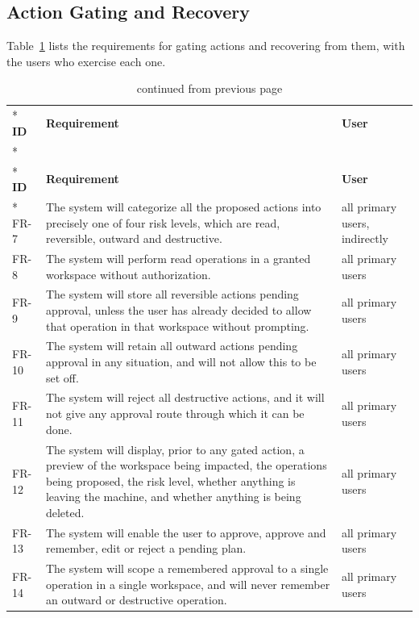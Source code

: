 \documentclass{FastFyp}
\begin{document}
\subsection{Action Gating and Recovery}
Table~\ref{tab:fr2} lists the requirements for gating actions and recovering from them, with the users who exercise each one.

{\small
{}
\begin{longtable}{|p{1.3cm}|p{9.8cm}|p{3.0cm}|}
\caption{Functional requirements: action gating and recovery.}\label{tab:fr2}\\*
\hline
\textbf{ID} & \textbf{Requirement} & \textbf{User} \\*
\hline
\endfirsthead
\caption[]{continued from previous page}\\*
\hline
\textbf{ID} & \textbf{Requirement} & \textbf{User} \\*
\hline
\endhead
FR-7 & The system will categorize all the proposed actions into precisely one of four risk levels, which are read, reversible, outward and destructive. & all primary users, indirectly \\
\hline
FR-8 & The system will perform read operations in a granted workspace without authorization. & all primary users \\
\hline
FR-9 & The system will store all reversible actions pending approval, unless the user has already decided to allow that operation in that workspace without prompting. & all primary users \\
\hline
FR-10 & The system will retain all outward actions pending approval in any situation, and will not allow this to be set off. & all primary users \\
\hline
FR-11 & The system will reject all destructive actions, and it will not give any approval route through which it can be done. & all primary users \\
\hline
FR-12 & The system will display, prior to any gated action, a preview of the workspace being impacted, the operations being proposed, the risk level, whether anything is leaving the machine, and whether anything is being deleted. & all primary users \\
\hline
FR-13 & The system will enable the user to approve, approve and remember, edit or reject a pending plan. & all primary users \\
\hline
FR-14 & The system will scope a remembered approval to a single operation in a single workspace, and will never remember an outward or destructive operation. & all primary users \\

\end{longtable}}
\end{document}

